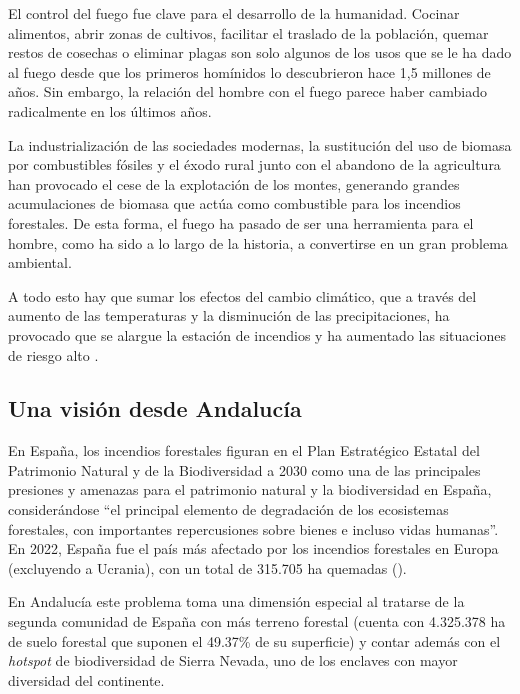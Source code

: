 \documentclass[12pt,a4paper,]{book}
\numberwithin{dummy}{section}
\theoremstyle{ocrenumbox}
\theoremstyle{blacknumex}
\theoremstyle{blacknumbox}
\theoremstyle{ocrenum}
\theoremstyle{ocrenum}
\begin{document}
El control del fuego fue clave para el desarrollo de la humanidad.
Cocinar alimentos, abrir zonas de cultivos, facilitar el traslado de la
población, quemar restos de cosechas o eliminar plagas son solo algunos
de los usos que se le ha dado al fuego desde que los primeros homínidos
lo descubrieron hace 1,5 millones de años. Sin embargo, la relación del
hombre con el fuego parece haber cambiado radicalmente en los últimos
años.

La industrialización de las sociedades modernas, la sustitución del uso
de biomasa por combustibles fósiles y el éxodo rural junto con el
abandono de la agricultura han provocado el cese de la explotación de
los montes, generando grandes acumulaciones de biomasa que actúa como
combustible para los incendios forestales. De esta forma, el fuego ha
pasado de ser una herramienta para el hombre, como ha sido a lo largo de
la historia, a convertirse en un gran problema ambiental.

A todo esto hay que sumar los efectos del cambio climático, que a través
del aumento de las temperaturas y la disminución de las precipitaciones,
ha provocado que se alargue la estación de incendios y ha aumentado las
situaciones de riesgo alto \citep{incendioCamCLim}.

\hypertarget{una-visiuxf3n-desde-andalucuxeda}{%
\subsection*{Una visión desde
Andalucía}\label{una-visiuxf3n-desde-andalucuxeda}}

En España, los incendios forestales figuran en el Plan Estratégico
Estatal del Patrimonio Natural y de la Biodiversidad a 2030 como una de
las principales presiones y amenazas para el patrimonio natural y la
biodiversidad en España, considerándose ``el principal elemento de
degradación de los ecosistemas forestales, con importantes repercusiones
sobre bienes e incluso vidas humanas''. En 2022, España fue el país más
afectado por los incendios forestales en Europa (excluyendo a Ucrania),
con un total de 315.705 ha quemadas (\citet{effis2022}).

En Andalucía este problema toma una dimensión especial al tratarse de la
segunda comunidad de España con más terreno forestal (cuenta con
4.325.378 ha de suelo forestal que suponen el 49.37\% de su superficie)
y contar además con el \emph{hotspot} de biodiversidad de Sierra Nevada,
uno de los enclaves con mayor diversidad del continente.
\end{document}
